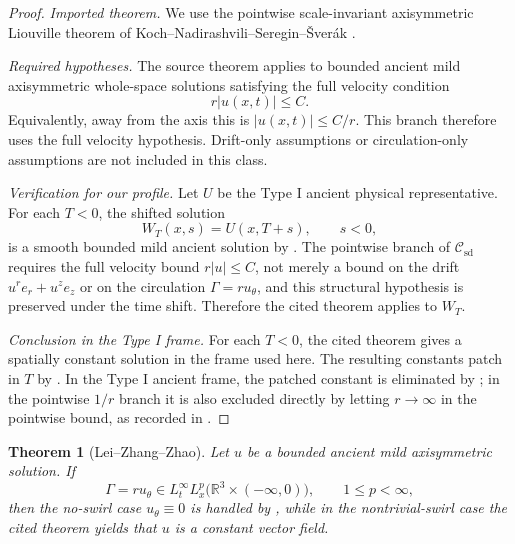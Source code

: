 \documentclass[11pt]{amsart}
\theoremstyle{plain}
\newtheorem{theorem}{Theorem}[section]
\theoremstyle{definition}
\theoremstyle{remark}
\numberwithin{equation}{section}
\newcommand{\calC}{\mathcal C}
\begin{document}
\begin{proof}
\smallskip
\noindent\emph{Imported theorem.}
We use the pointwise scale-invariant axisymmetric Liouville theorem of
Koch--Nadirashvili--Seregin--\v{S}ver\'ak
\cite[Theorem 5.3]{KNSS2009}.

\smallskip
\noindent\emph{Required hypotheses.}
The source theorem applies to bounded ancient mild axisymmetric whole-space
solutions satisfying the full velocity condition
\[
   r|u(x,t)|\le C .
\]
Equivalently, away from the axis this is \(|u(x,t)|\le C/r\).  This branch
therefore uses the full velocity hypothesis.  Drift-only assumptions or
circulation-only assumptions are not included in this class.

\smallskip
\noindent\emph{Verification for our profile.}
Let \(U\) be the Type I ancient physical representative.  For each \(T<0\),
the shifted solution
\[
   W_T(x,s)=U(x,T+s),\qquad s<0,
\]
is a smooth bounded mild ancient solution by .  The
pointwise branch of \(\calC_{\mathrm{sd}}\) requires the full velocity bound
\(r|u|\le C\), not merely a bound on the drift \(u^r e_r+u^z e_z\) or on the
circulation \(\Gamma=ru_\theta\), and this structural hypothesis is preserved
under the time shift.  Therefore the cited theorem applies to \(W_T\).

\smallskip
\noindent\emph{Conclusion in the Type I frame.}
For each \(T<0\), the cited theorem gives a spatially constant solution in the
frame used here.  The resulting constants patch in \(T\) by
.  In the Type I ancient frame, the patched
constant is eliminated by ; in the pointwise
\(1/r\) branch it is also excluded directly by letting \(r\to\infty\) in the
pointwise bound, as recorded in .
\end{proof}

\begin{theorem}[Lei--Zhang--Zhao]
\label{p3:thm:lzz}
Let \(u\) be a bounded ancient mild axisymmetric solution.  If
\[
   \Gamma=ru_\theta\in L_t^\infty L_x^p
   \bigl(\mathbb R^3\times(-\infty,0)\bigr),
   \qquad 1\le p<\infty,
\]
then the no-swirl case \(u_\theta\equiv0\) is handled by
, while in the nontrivial-swirl case the cited
theorem yields that \(u\) is a constant vector field.
\end{theorem}
\end{document}
